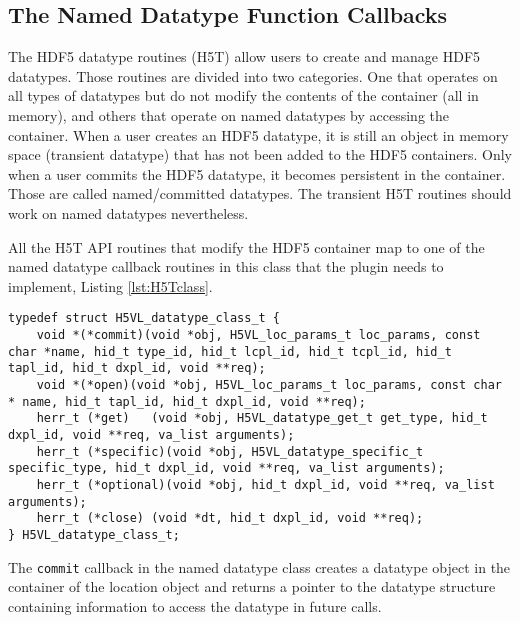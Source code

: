 \subsection{The Named Datatype Function Callbacks}
The HDF5 datatype routines (H5T) allow users to create and manage HDF5
datatypes. Those routines are divided into two categories. One that
operates on all types of datatypes but do not modify the contents of
the container (all in memory), and others that operate on named
datatypes by accessing the container. When a user creates an HDF5
datatype, it is still an object in memory space (transient datatype)
that has not been added to the HDF5 containers. Only when a user
commits the HDF5 datatype, it becomes persistent in the
container. Those are called named/committed datatypes. The transient
H5T routines should work on named datatypes nevertheless. 

All the H5T API routines that modify the HDF5 container map to one of
the named datatype callback routines in this class that the plugin needs to
implement, Listing \ref{lst:H5Tclass}.

\begin{lstlisting}[caption={Structure for datatype callback routines, H5VLpublic.h}, captionpos=b, label={lst:H5Tclass}]
typedef struct H5VL_datatype_class_t {
    void *(*commit)(void *obj, H5VL_loc_params_t loc_params, const char *name, hid_t type_id, hid_t lcpl_id, hid_t tcpl_id, hid_t tapl_id, hid_t dxpl_id, void **req);
    void *(*open)(void *obj, H5VL_loc_params_t loc_params, const char * name, hid_t tapl_id, hid_t dxpl_id, void **req);
    herr_t (*get)   (void *obj, H5VL_datatype_get_t get_type, hid_t dxpl_id, void **req, va_list arguments);
    herr_t (*specific)(void *obj, H5VL_datatype_specific_t specific_type, hid_t dxpl_id, void **req, va_list arguments);
    herr_t (*optional)(void *obj, hid_t dxpl_id, void **req, va_list arguments);
    herr_t (*close) (void *dt, hid_t dxpl_id, void **req);
} H5VL_datatype_class_t;
\end{lstlisting}

The \texttt{commit} callback in the named datatype class creates a datatype object in the container of the location object and
returns a pointer to the datatype structure containing information to access the datatype in future calls.\bigskip

